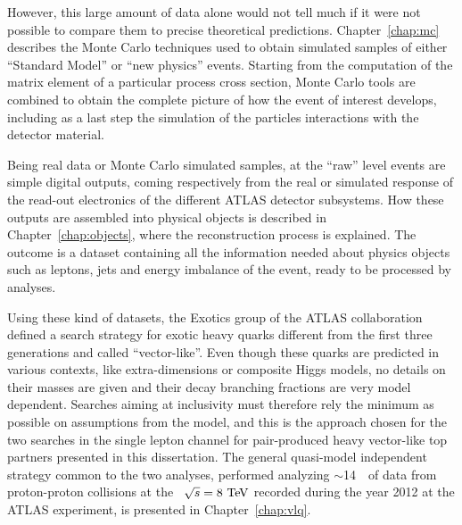 However, this large amount of data alone would 
not tell much if it were not possible to
compare them to precise theoretical predictions.
Chapter~\ref{chap:mc} describes the Monte Carlo techniques used
to obtain simulated samples of either ``Standard Model'' %
or ``new physics'' events. 
Starting from the computation of the matrix element of a 
particular process cross section, Monte Carlo tools
are combined to obtain the complete picture of how the
event of interest develops, including as a last step
the simulation of the particles interactions with the
detector material.

Being real data or Monte Carlo simulated samples, at
the ``raw'' level events are simple digital outputs, coming respectively
from the real or simulated response of the read-out electronics
of the different ATLAS detector subsystems. How these outputs
are assembled into physical objects is described in Chapter~\ref{chap:objects},
where the reconstruction process is explained.
The outcome is a dataset containing all the information needed
about physics objects such as leptons, jets and energy 
imbalance of the event,
ready to be processed by analyses.


Using these kind of datasets, 
the Exotics group of the ATLAS collaboration defined a search strategy 
for exotic heavy quarks different from the first three generations 
and called ``vector-like''. Even though these quarks are
predicted in various contexts, like extra-dimensions or composite Higgs
models, no details on their masses are given and their decay branching fractions
are very model dependent. Searches aiming at inclusivity 
must therefore rely the minimum as possible on 
assumptions from the model, and this is the approach chosen for the
two searches in the single lepton channel
for pair-produced heavy vector-like top partners 
presented in this dissertation. The general quasi-model independent
strategy common to the two analyses, performed analyzing 
$\sim$14~\ifb\ of data from proton-proton collisions at the
 \cme\ $\rts=8\tev$ recorded during the year 2012 
at the ATLAS experiment, is presented in
Chapter~\ref{chap:vlq}.

